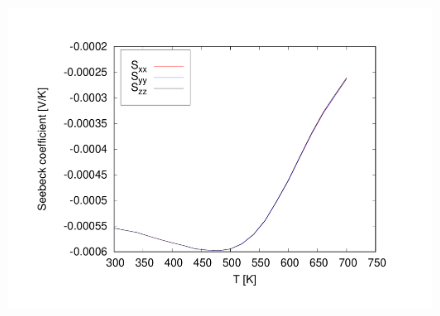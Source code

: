 \begin{itemize}
\begin{figure}[h!]
\centering
\includegraphics[width=0.7\columnwidth]{figure/example16/Si_seebeck_vs_T.pdf}
\caption{}\label{fig16.5}
\end{figure}
\end{itemize}



